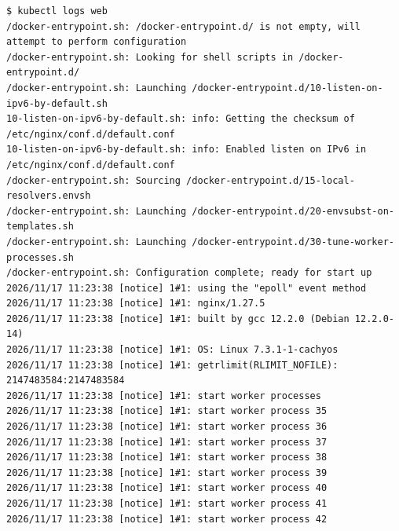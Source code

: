\documentclass[11pt,a4paper]{article}
\begin{document}
\par\medskip\noindent\begin{minipage}{\linewidth}
\par\vspace{4pt}\noindent\begin{minipage}{\linewidth}
\begin{Verbatim}[breaklines=true,breakanywhere=true,fontsize=\footnotesize,frame=single,framesep=8pt,rulecolor=\color{teal}]
$ kubectl logs web
/docker-entrypoint.sh: /docker-entrypoint.d/ is not empty, will attempt to perform configuration
/docker-entrypoint.sh: Looking for shell scripts in /docker-entrypoint.d/
/docker-entrypoint.sh: Launching /docker-entrypoint.d/10-listen-on-ipv6-by-default.sh
10-listen-on-ipv6-by-default.sh: info: Getting the checksum of /etc/nginx/conf.d/default.conf
10-listen-on-ipv6-by-default.sh: info: Enabled listen on IPv6 in /etc/nginx/conf.d/default.conf
/docker-entrypoint.sh: Sourcing /docker-entrypoint.d/15-local-resolvers.envsh
/docker-entrypoint.sh: Launching /docker-entrypoint.d/20-envsubst-on-templates.sh
/docker-entrypoint.sh: Launching /docker-entrypoint.d/30-tune-worker-processes.sh
/docker-entrypoint.sh: Configuration complete; ready for start up
2026/11/17 11:23:38 [notice] 1#1: using the "epoll" event method
2026/11/17 11:23:38 [notice] 1#1: nginx/1.27.5
2026/11/17 11:23:38 [notice] 1#1: built by gcc 12.2.0 (Debian 12.2.0-14) 
2026/11/17 11:23:38 [notice] 1#1: OS: Linux 7.3.1-1-cachyos
2026/11/17 11:23:38 [notice] 1#1: getrlimit(RLIMIT_NOFILE): 2147483584:2147483584
2026/11/17 11:23:38 [notice] 1#1: start worker processes
2026/11/17 11:23:38 [notice] 1#1: start worker process 35
2026/11/17 11:23:38 [notice] 1#1: start worker process 36
2026/11/17 11:23:38 [notice] 1#1: start worker process 37
2026/11/17 11:23:38 [notice] 1#1: start worker process 38
2026/11/17 11:23:38 [notice] 1#1: start worker process 39
2026/11/17 11:23:38 [notice] 1#1: start worker process 40
2026/11/17 11:23:38 [notice] 1#1: start worker process 41
2026/11/17 11:23:38 [notice] 1#1: start worker process 42
\end{Verbatim}
\end{minipage}\par\vspace{6pt}

\end{minipage}\par\medskip
\end{document}
